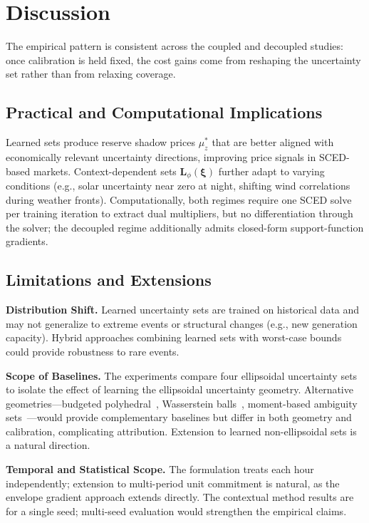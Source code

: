 \documentclass[11pt]{article}
\newcommand{\bxi}{\bm{\xi}}
\newcommand{\bL}{\bm{L}}
\theoremstyle{definition}
\begin{document}
\section{Discussion}
\label{sec:discussion}

The empirical pattern is consistent across the coupled and decoupled studies: once calibration is held fixed, the cost gains come from reshaping the uncertainty set rather than from relaxing coverage.

\subsection{Practical and Computational Implications}

Learned sets produce reserve shadow prices $\mu_z^*$ that are better aligned with economically relevant uncertainty directions, improving price signals in SCED-based markets. Context-dependent sets $\bL_\phi(\bxi)$ further adapt to varying conditions (e.g., solar uncertainty near zero at night, shifting wind correlations during weather fronts). Computationally, both regimes require one SCED solve per training iteration to extract dual multipliers, but no differentiation through the solver; the decoupled regime additionally admits closed-form support-function gradients.

\subsection{Limitations and Extensions}

\textbf{Distribution Shift.} Learned uncertainty sets are trained on historical data and may not generalize to extreme events or structural changes (e.g., new generation capacity). Hybrid approaches combining learned sets with worst-case bounds could provide robustness to rare events.

\textbf{Scope of Baselines.} The experiments compare four ellipsoidal uncertainty sets to isolate the effect of learning the ellipsoidal uncertainty geometry. Alternative geometries---budgeted polyhedral~\citep{bertsimas2004price}, Wasserstein balls~\citep{esfahani2018data}, moment-based ambiguity sets~\citep{xiong2017distributionally}---would provide complementary baselines but differ in both geometry and calibration, complicating attribution. Extension to learned non-ellipsoidal sets is a natural direction.

\textbf{Temporal and Statistical Scope.} The formulation treats each hour independently; extension to multi-period unit commitment is natural, as the envelope gradient approach extends directly. The contextual method results are for a single seed; multi-seed evaluation would strengthen the empirical claims.
\end{document}
